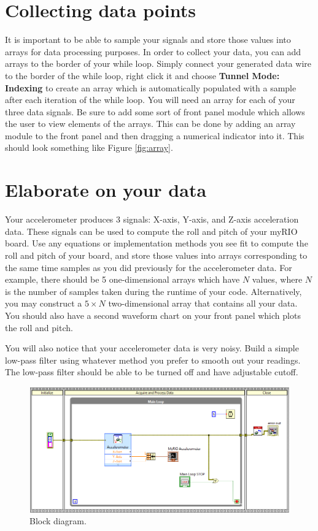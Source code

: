 \documentclass{article}
\begin{document}
\section{Collecting data points}
It is important to be able to sample your signals and store those values into arrays for data processing purposes. In order to collect your data, you can add arrays to the border of your while loop. Simply connect your generated data wire to the border of the while loop, right click it and choose \textbf{Tunnel Mode: Indexing} to create an array which is automatically populated with a sample after each iteration of the while loop. You will need an array for each of your three data signals. Be sure to add some sort of front panel module which allows the user to view elements of the arrays. This can be done by adding an array module to the front panel and then dragging a numerical indicator into it. This should look something like Figure \ref{fig:array}.

\section{Elaborate on your data}
Your accelerometer produces 3 signals: X-axis, Y-axis, and Z-axis acceleration data. These signals can be used to compute the roll and pitch of your myRIO board. Use any equations or implementation methods you see fit to compute the roll and pitch of your board, and store those values into arrays corresponding to the same time samples as you did previously for the accelerometer data. For example, there should be 5 one-dimensional arrays which have $N$ values, where $N$ is the number of samples taken during the runtime of your code. Alternatively, you may construct a $5 \times N$ two-dimensional array that contains all your data. You should also have a second waveform chart on your front panel which plots the roll and pitch. 

You will also notice that your accelerometer data is very noisy. Build a simple low-pass filter using whatever method you prefer to smooth out your readings. The low-pass filter should be able to be turned off and have adjustable cutoff. 


\begin{figure}[h!]
\hspace{-20mm} 
\includegraphics[scale=0.82]{figs/_4.png}
\caption{Block diagram.}
\label{fig:_4}
\end{figure}
\end{document}
